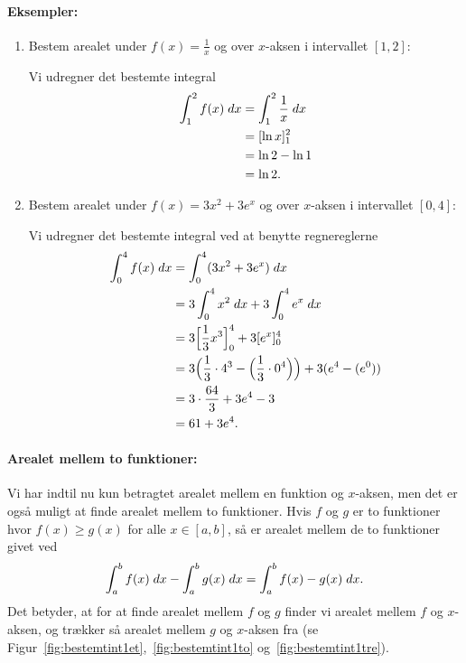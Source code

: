 \paragraph*{Eksempler:}
\begin{enumerate}
\item Bestem arealet under $f(x)=\frac{1}{x}$ og over $x$-aksen i intervallet $[1,2]$:

Vi udregner det bestemte integral
\begin{align*}
\int_1^2 f(x) \; d x &= \int_1^2 \frac{1}{x} \; d x \\
&=[\ln x]_1^2 \\
&=\ln 2 - \ln 1 \\
&=\ln 2.
\end{align*}

\item Bestem arealet under $f(x)=3x^2+3e^x$ og over $x$-aksen i intervallet $[0,4]$:

Vi udregner det bestemte integral ved at benytte regnereglerne
\begin{align*}
\int_0^4 f(x) \; d x &= \int_0^4 (3x^2+3e^x) \; d x \\
&= 3\int_0^4 x^2 \; d x+ 3 \int_0^4 e^x \; d x \\
&= 3\Big[ \frac{1}{3}x^3 \Big]_0^4 + 3[e^x]_0^4 \\
&=3 \Big(\frac{1}{3}\cdot 4^3 - \Big(\frac{1}{3} \cdot 0^4 \Big) \Big) + 3 ( e^4 - (e^0)) \\
&=3 \cdot \frac{64}{3} + 3e^4-3\\
&=61+3e^4.
\end{align*}
\end{enumerate}

\paragraph*{Arealet mellem to funktioner:}
Vi har indtil nu kun betragtet arealet mellem en funktion og $x$-aksen, men det er også muligt at finde arealet mellem to funktioner. Hvis $f$ og $g$ er to funktioner hvor $f(x) \geq g(x)$ for alle $x \in [a,b]$, så er arealet mellem de to funktioner givet ved
\begin{align*}
\int_a^b f(x) \; d x - \int_a^b g(x) \; d x = \int_a^b f(x) - g(x) \; d x.
\end{align*}
Det betyder, at for at finde arealet mellem $f$ og $g$ finder vi arealet mellem $f$ og $x$-aksen, og trækker så arealet mellem $g$ og $x$-aksen fra (se Figur~\ref{fig:bestemtint1et},~\ref{fig:bestemtint1to} og~\ref{fig:bestemtint1tre}).


